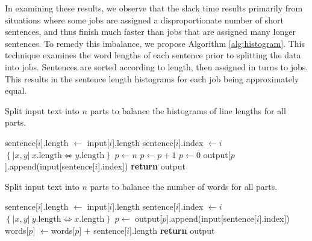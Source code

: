 \documentclass[11pt,letterpaper]{article}
\begin{document}
In examining these results, we observe that the slack time results primarily from situations where some jobs are assigned a disproportionate number of short sentences, and thus finish much faster than jobs that are assigned many longer sentences. To remedy this imbalance, we propose Algorithm \ref{alg:histogram}. This technique examines the word lengths of each sentence prior to splitting the data into jobs. Sentences are sorted according to length, then assigned in turns to jobs. This results in the sentence length histograms for each job being approximately equal. 
%
\begin{algorithm}[!t]
\caption{Split input text into $n$ parts to balance the histograms of line lengths for all parts.}
\begin{algorithmic}
\State sentence[$i$].length $\gets$ input[$i$].length
\State sentence[$i$].index $\gets i$
\EndFor
\State {} $\left\{|x,y|\ x.\mbox{length}\Leftrightarrow y.\mbox{length}\right\}$ 
\State {}
\State $p \gets n$
\State $p \gets p+1$
\Else
\State $p \gets 0$
\EndIf
\State output[$p$].append(input[sentence[$i$].index])
\EndFor
\State \textbf{return} output
\EndFunction
\end{algorithmic}
\label{alg:histogram}
\end{algorithm}
%
%
%
%
\begin{algorithm}[!t]
\caption{Split input text into $n$ parts to balance the number of words for all parts.}
\begin{algorithmic}
\State sentence[$i$].length $\gets$ input[$i$].length
\State sentence[$i$].index $\gets i$
\EndFor
\State {} $\left\{|x,y|\ y.\mbox{length}\Leftrightarrow x.\mbox{length}\right\}$ 
\State {}
\State $p \gets$ 
\State {}
\State output[$p$].append(input[sentence[$i$].index])
\State words[$p$] $\gets$\hspace{0em}words[$p$] $+$ sentence[$i$].length%
\EndFor
\State \textbf{return} output
\EndFunction
\end{algorithmic}
\label{alg:words}
\end{algorithm}
\end{document}
